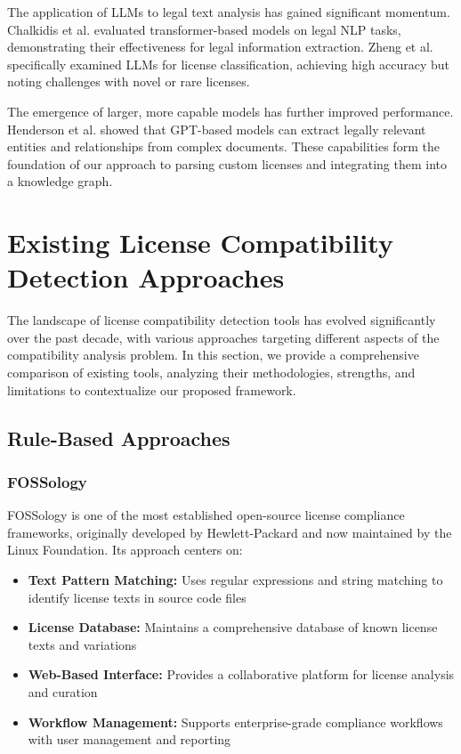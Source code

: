 \documentclass[9pt,twocolumn]{article}
\begin{document}
The application of LLMs to legal text analysis has gained significant momentum. Chalkidis et al. \cite{chalkidis2020legal} evaluated transformer-based models on legal NLP tasks, demonstrating their effectiveness for legal information extraction. Zheng et al. \cite{zheng2021does} specifically examined LLMs for license classification, achieving high accuracy but noting challenges with novel or rare licenses.

The emergence of larger, more capable models has further improved performance. Henderson et al. \cite{henderson2022legal} showed that GPT-based models can extract legally relevant entities and relationships from complex documents. These capabilities form the foundation of our approach to parsing custom licenses and integrating them into a knowledge graph.

\section{Existing License Compatibility Detection Approaches}
\label{sec:existing_approaches}

The landscape of license compatibility detection tools has evolved significantly over the past decade, with various approaches targeting different aspects of the compatibility analysis problem. In this section, we provide a comprehensive comparison of existing tools, analyzing their methodologies, strengths, and limitations to contextualize our proposed framework.

\subsection{Rule-Based Approaches}

\subsubsection{FOSSology}
FOSSology \cite{fossology} is one of the most established open-source license compliance frameworks, originally developed by Hewlett-Packard and now maintained by the Linux Foundation. Its approach centers on:

\begin{itemize}
    \item \textbf{Text Pattern Matching:} Uses regular expressions and string matching to identify license texts in source code files
    \item \textbf{License Database:} Maintains a comprehensive database of known license texts and variations
    \item \textbf{Web-Based Interface:} Provides a collaborative platform for license analysis and curation
    \item \textbf{Workflow Management:} Supports enterprise-grade compliance workflows with user management and reporting
\end{itemize}
\end{document}
